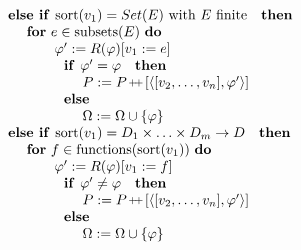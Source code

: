 \documentclass{article}
\providecommand{\concat}{\ensuremath{\hspace{0.12em}\raisebox{0.2ex}{\text{\scriptsize+}\!\text{\scriptsize+}}\hspace{0.12em}}}
\begin{document}
\[
\begin{tabular}{l}
\qquad \qquad \qquad $\text{\textbf{else if }}\mathrm{sort}(v_{1})=Set(E)$
with $E$ finite$\text{ \textbf{then}}$ \\ 
\qquad \qquad \qquad \qquad \textbf{for} $e\in \mathrm{subsets}(E)$ \textbf{%
do} \\ 
\qquad \qquad \qquad \qquad \qquad $\varphi ^{\prime }:=R(\varphi )[v_{1}:=e]
$ \\ 
\qquad \qquad \qquad \qquad \qquad $\text{\textbf{if }}\varphi ^{\prime
}=\varphi \text{ \textbf{then}}$ \\ 
\qquad \qquad \qquad \qquad \qquad \qquad $P:=P\concat\lbrack \left\langle
[v_{2},\ldots ,v_{n}],\varphi ^{\prime }\right\rangle ]$ \\ 
\qquad \qquad \qquad \qquad \qquad $\text{\textbf{else}}$ \\ 
\qquad \qquad \qquad \qquad \qquad \qquad $\Omega :=\Omega \cup \left\{
\varphi \right\} $ \\ 
\qquad \qquad \qquad $\text{\textbf{else if }}\mathrm{sort}%
(v_{1})=D_{1}\times \ldots \times D_{m}\rightarrow D\text{ \textbf{then}}$
\\ 
\qquad \qquad \qquad \qquad \textbf{for} $f\in \mathrm{functions}(\mathrm{%
sort}(v_{1}))$ \textbf{do} \\ 
\qquad \qquad \qquad \qquad \qquad $\varphi ^{\prime }:=R(\varphi )[v_{1}:=f]
$ \\ 
\qquad \qquad \qquad \qquad \qquad $\text{\textbf{if }}\varphi ^{\prime
}\neq \varphi \text{ \textbf{then}}$ \\ 
\qquad \qquad \qquad \qquad \qquad \qquad $P:=P\concat\lbrack \left\langle
[v_{2},\ldots ,v_{n}],\varphi ^{\prime }\right\rangle ]$ \\ 
\qquad \qquad \qquad \qquad \qquad $\text{\textbf{else}}$ \\ 
\qquad \qquad \qquad \qquad \qquad \qquad $\Omega :=\Omega \cup \left\{
\varphi \right\} $%
\end{tabular}%
\]
\end{document}

